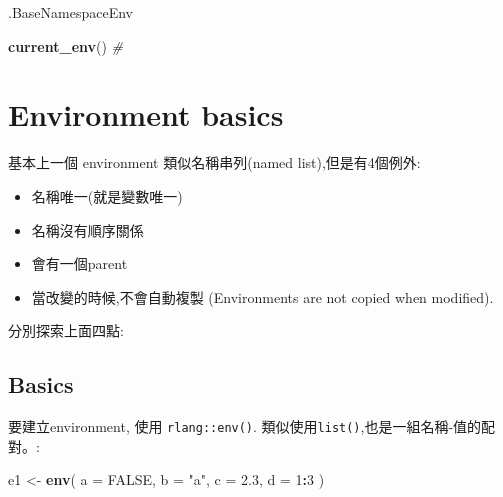 \documentclass[]{book}
\newenvironment{Shaded}{\begin{snugshade}}{\end{snugshade}}
\newcommand{\CommentTok}[1]{\textcolor[rgb]{0.56,0.35,0.01}{\textit{#1}}}
\newcommand{\DataTypeTok}[1]{\textcolor[rgb]{0.13,0.29,0.53}{#1}}
\newcommand{\DecValTok}[1]{\textcolor[rgb]{0.00,0.00,0.81}{#1}}
\newcommand{\FloatTok}[1]{\textcolor[rgb]{0.00,0.00,0.81}{#1}}
\newcommand{\KeywordTok}[1]{\textcolor[rgb]{0.13,0.29,0.53}{\textbf{#1}}}
\newcommand{\NormalTok}[1]{#1}
\newcommand{\OperatorTok}[1]{\textcolor[rgb]{0.81,0.36,0.00}{\textbf{#1}}}
\newcommand{\OtherTok}[1]{\textcolor[rgb]{0.56,0.35,0.01}{#1}}
\newcommand{\StringTok}[1]{\textcolor[rgb]{0.31,0.60,0.02}{#1}}
\providecommand{\tightlist}{%
  \setlength{\itemsep}{0pt}\setlength{\parskip}{0pt}}
\theoremstyle{definition}
\theoremstyle{definition}
\theoremstyle{definition}
\theoremstyle{remark}
\begin{document}
\begin{Shaded}
\begin{Highlighting}[]
\NormalTok{.BaseNamespaceEnv}
\end{Highlighting}
\end{Shaded}

\begin{Shaded}
\begin{Highlighting}[]
\KeywordTok{current_env}\NormalTok{() }\CommentTok{#}
\end{Highlighting}
\end{Shaded}

\hypertarget{env-basics}{%
\section{Environment basics}\label{env-basics}}

基本上一個 environment 類似名稱串列(named list),但是有4個例外:

\begin{itemize}
\tightlist
\item
  名稱唯一(就是變數唯一)\\
\item
  名稱沒有順序關係\\
\item
  會有一個parent\\
\item
  當改變的時候,不會自動複製 (Environments are not copied when modified).
\end{itemize}

分別探索上面四點:

\hypertarget{basics}{%
\subsection{Basics}\label{basics}}

要建立environment, 使用 \texttt{rlang::env()}.
類似使用\texttt{list()},也是一組名稱-值的配對。:

\begin{Shaded}
\begin{Highlighting}[]
\NormalTok{e1 <-}\StringTok{ }\KeywordTok{env}\NormalTok{(}
  \DataTypeTok{a =} \OtherTok{FALSE}\NormalTok{,}
  \DataTypeTok{b =} \StringTok{"a"}\NormalTok{,}
  \DataTypeTok{c =} \FloatTok{2.3}\NormalTok{,}
  \DataTypeTok{d =} \DecValTok{1}\OperatorTok{:}\DecValTok{3}
\NormalTok{)}
\end{Highlighting}
\end{Shaded}
\end{document}
